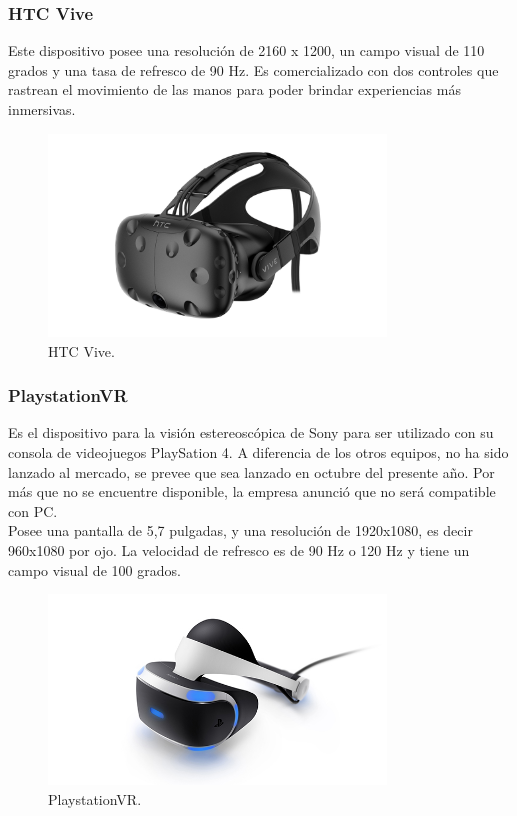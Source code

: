 \documentclass[12pt]{article}
\begin{document}
\subsubsection{HTC Vive}
Este dispositivo posee una resolución de 2160 x 1200, un campo visual de 110 grados y una tasa de refresco de 90 Hz. Es comercializado con dos controles que rastrean el movimiento de las manos para poder brindar experiencias más inmersivas\cite{htcvive}.
\begin{figure}[h!]
\includegraphics[width=0.8\textwidth,center]{htc.png}
\caption{HTC Vive.}
\end{figure}
\subsubsection{PlaystationVR}
Es el dispositivo para la visión estereoscópica de Sony para ser utilizado con su consola de videojuegos PlaySation 4. A diferencia de los otros equipos, no ha sido lanzado al mercado, se prevee que sea lanzado en octubre del presente año. Por más que no se encuentre disponible, la empresa anunció que no será compatible con PC.
\\Posee una pantalla de 5,7 pulgadas, y una resolución de 1920x1080, es decir 960x1080 por ojo. La velocidad de refresco es de 90 Hz o 120 Hz y tiene un campo visual de 100 grados\cite{psvrspecs}.
\clearpage
\begin{figure}[h!]
\includegraphics[width=0.8\textwidth,center]{psvr.jpg}
\caption{PlaystationVR.}
\end{figure}
\end{document}
